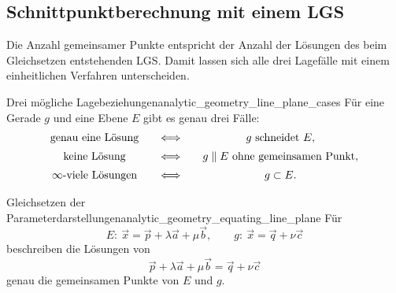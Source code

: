 \subsection{Schnittpunktberechnung mit einem LGS}
\label{subsec:analytic_geometry_line_plane_intersection}

Die Anzahl gemeinsamer Punkte entspricht der Anzahl der Lösungen des beim
Gleichsetzen entstehenden LGS. Damit lassen sich alle drei Lagefälle mit einem
einheitlichen Verfahren unterscheiden.

\begin{center}
\end{center}

\begin{KeyPointBox}{Drei mögliche Lagebeziehungen}{analytic_geometry_line_plane_cases}
  Für eine Gerade $g$ und eine Ebene $E$ gibt es genau drei Fälle:
  \[
    \begin{array}{c@{\qquad\Longleftrightarrow\qquad}c}
      \text{genau eine Lösung} & g\text{ schneidet }E,\\[0.5em]
      \text{keine Lösung} & g\parallel E\text{ ohne gemeinsamen Punkt},\\[0.5em]
      \infty\text{-viele Lösungen} & g\subset E.
    \end{array}
  \]
\end{KeyPointBox}

\begin{TheoremBox}{Gleichsetzen der Parameterdarstellungen}{analytic_geometry_equating_line_plane}
  Für
  \[
    E:\ \vec x=\vec p+\lambda\vec a+\mu\vec b,
    \qquad
    g:\ \vec x=\vec q+\nu\vec c
  \]
  beschreiben die Lösungen von
  \[
    \vec p+\lambda\vec a+\mu\vec b
    =\vec q+\nu\vec c
  \]
  genau die gemeinsamen Punkte von $E$ und $g$.
\end{TheoremBox}

